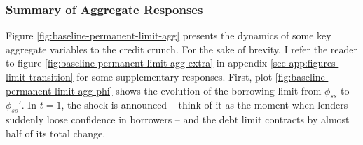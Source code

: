 \documentclass[a4paper,12pt]{article} %
\numberwithin{equation}{section} %
\numberwithin{figure}{section}
\numberwithin{table}{section}
\begin{document}
\subsubsection{Summary of Aggregate Responses}
\label{sec:limit-transition-summ}

Figure \ref{fig:baseline-permanent-limit-agg} presents the dynamics of some key aggregate variables to the credit crunch. For the sake of brevity, I refer the reader to figure \ref{fig:baseline-permanent-limit-agg-extra} in appendix \ref{sec-app:figures-limit-transition} for some supplementary responses. First, plot \ref{fig:baseline-permanent-limit-agg-phi} shows the evolution of the borrowing limit from $\phi_{ss}$ to $\phi_{ss}'$. In $t=1$, the shock is announced -- think of it as the moment when lenders suddenly loose confidence in borrowers -- and the debt limit contracts by almost half of its total change.
\end{document}
